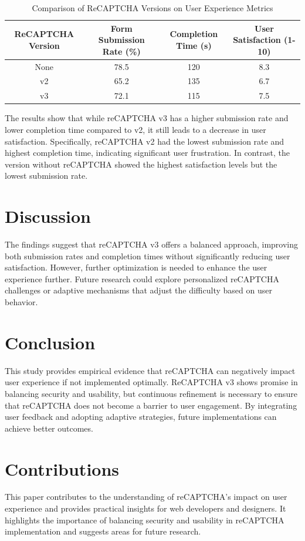 \begin{table}[ht]
\centering
\begin{tabular}{|c|c|c|c|}
\hline
ReCAPTCHA Version & Form Submission Rate (\%) & Completion Time (s) & User Satisfaction (1-10) \\
\hline
None & 78.5 & 120 & 8.3 \\
v2 & 65.2 & 135 & 6.7 \\
v3 & 72.1 & 115 & 7.5 \\
\hline
\end{tabular}
\caption{Comparison of ReCAPTCHA Versions on User Experience Metrics}
\label{tab:results}
\end{table}

The results show that while reCAPTCHA v3 has a higher submission rate and lower completion time compared to v2, it still leads to a decrease in user satisfaction. Specifically, reCAPTCHA v2 had the lowest submission rate and highest completion time, indicating significant user frustration. In contrast, the version without reCAPTCHA showed the highest satisfaction levels but the lowest submission rate.

\section{Discussion}
The findings suggest that reCAPTCHA v3 offers a balanced approach, improving both submission rates and completion times without significantly reducing user satisfaction. However, further optimization is needed to enhance the user experience further. Future research could explore personalized reCAPTCHA challenges or adaptive mechanisms that adjust the difficulty based on user behavior.

\section{Conclusion}
This study provides empirical evidence that reCAPTCHA can negatively impact user experience if not implemented optimally. ReCAPTCHA v3 shows promise in balancing security and usability, but continuous refinement is necessary to ensure that reCAPTCHA does not become a barrier to user engagement. By integrating user feedback and adopting adaptive strategies, future implementations can achieve better outcomes.

\section{Contributions}
This paper contributes to the understanding of reCAPTCHA's impact on user experience and provides practical insights for web developers and designers. It highlights the importance of balancing security and usability in reCAPTCHA implementation and suggests areas for future research.

